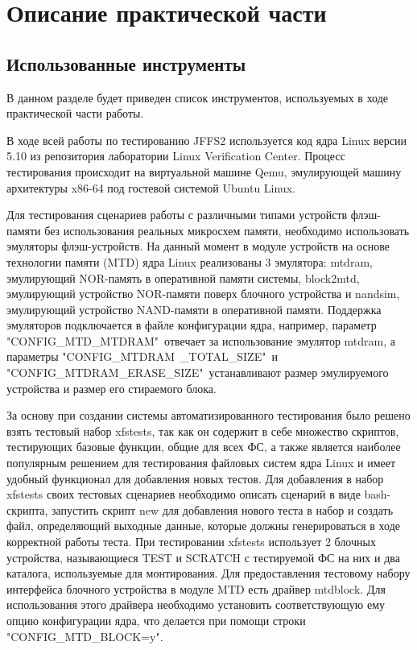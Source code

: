 \section{Описание практической части}
\label{sec:Chapter4} 

\subsection{Использованные инструменты}

В данном разделе будет приведен список инструментов, используемых в ходе практической части работы.

В ходе всей работы по тестированию JFFS2 используется код ядра Linux версии 5.10 из репозитория \cite{lvcrepo} лаборатории Linux Verification Center. Процесс тестирования происходит на виртуальной машине Qemu, эмулирующей машину архитектуры x86-64 под гостевой системой Ubuntu Linux.

Для тестирования сценариев работы с различными типами устройств флэш-памяти без использования реальных микросхем памяти, необходимо использовать эмуляторы флэш-устройств. На данный момент в модуле устройств на основе технологии памяти (MTD) \cite{mtd} ядра Linux реализованы 3 эмулятора: mtdram, эмулирующий NOR-память в оперативной памяти системы, block2mtd, эмулирующий устройство NOR-памяти поверх блочного устройства и nandsim, эмулирующий устройство NAND-памяти в оперативной памяти. Поддержка эмуляторов подключается в файле конфигурации ядра, например, параметр "CONFIG\_MTD\_MTDRAM"\ отвечает за использование эмулятор mtdram, а параметры "CONFIG\_MTDRAM\ \_TOTAL\_SIZE"\ и "CONFIG\_MTDRAM\_ERASE\_SIZE"\ устанавливают размер эмулируемого устройства и размер его стираемого блока.

За основу при создании системы автоматизированного тестирования было решено взять тестовый набор xfstests, так как он содержит в себе множество скриптов, тестирующих базовые функции, общие для всех ФС, а также является наиболее популярным решением для тестирования файловых систем ядра Linux и имеет удобный функционал для добавления новых тестов. Для добавления в набор xfstests своих тестовых сценариев необходимо описать сценарий в виде bash-скрипта, запустить скрипт new для добавления нового теста в набор и создать файл, определяющий выходные данные, которые должны генерироваться в ходе корректной работы теста. При тестировании xfstests использует 2 блочных устройства, называющиеся TEST и SCRATCH с тестируемой ФС на них и два каталога, используемые для монтирования. Для предоставления тестовому набору интерфейса блочного устройства в модуле MTD есть драйвер mtdblock. Для использования этого драйвера необходимо установить соответствующую ему опцию конфигурации ядра, что делается при помощи строки  "CONFIG\_MTD\_BLOCK=y".

